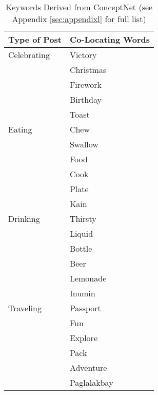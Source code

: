 \begin{table}[ph!]   %
	\centering
	\caption{Keywords Derived from ConceptNet (see Appendix \ref{sec:appendixl} for full list)} \vspace{0.25em}
	\begin{tabular}{|p{1.5in}|p{2in}|} \hline
		\centering Type of Post & Co-Locating Words \\ \hline
		Celebrating 
		& Victory \\ 
		& Christmas \\ 
		& Firework \\ 
		& Birthday \\ 
		& Toast \\\hline
		Eating  
		& Chew \\ 
		& Swallow \\ 
		& Food \\ 
		& Cook \\ 
		& Plate \\ 
		& Kain \\\hline
		
		Drinking 
		& Thirsty \\ 
		& Liquid \\
		& Bottle \\ 
		& Beer \\ 
		& Lemonade \\ 
		& Inumin \\\hline
		Traveling 
		& Passport \\ 
		& Fun \\ 
		& Explore \\ 
		& Pack \\ 
		& Adventure \\ 
		& Paglalakbay  \\\hline
	\end{tabular}
	\label{tab:EventClassificationConceptNet}
\end{table}

